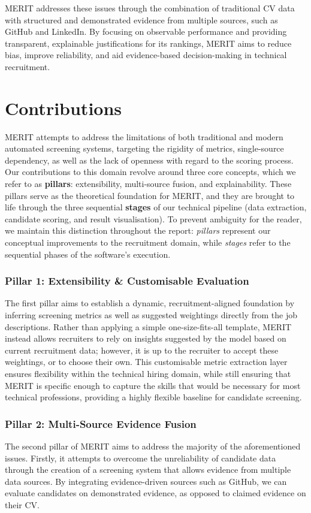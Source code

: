 MERIT addresses these issues through the combination of traditional CV data with structured and demonstrated
evidence from multiple sources, such as GitHub and LinkedIn. By focusing on observable performance and providing transparent,
explainable justifications for its rankings, MERIT aims to reduce bias, improve reliability, and aid evidence-based
decision-making in technical recruitment.


\section{Contributions}
MERIT attempts to address the limitations of both traditional and modern automated screening systems, targeting the
rigidity of metrics, single-source dependency, as well as the lack of openness with regard to the scoring process.
Our contributions to this domain revolve around three core concepts, which we refer to as \textbf{pillars}: 
extensibility, multi-source fusion, and explainability. These pillars serve as the theoretical foundation for 
MERIT, and they are brought to life through the three sequential \textbf{stages} of our technical pipeline (data 
extraction, candidate scoring, and result visualisation). To prevent ambiguity for the reader, we maintain this 
distinction throughout the report: \textit{pillars} represent our conceptual improvements to the recruitment domain, 
while \textit{stages} refer to the sequential phases of the software's execution.

\subsubsection{Pillar 1: Extensibility \& Customisable Evaluation}
The first pillar aims to establish a dynamic, recruitment-aligned foundation by inferring screening metrics as well as suggested weightings
directly from the job descriptions. Rather than applying a simple one-size-fits-all template, MERIT instead allows recruiters to 
rely on insights suggested by the model based on current recruitment data; however, it is up to the recruiter to accept these weightings,
or to choose their own. This customisable metric extraction layer ensures flexibility within the technical hiring domain, while still
ensuring that MERIT is specific enough to capture the skills that would be necessary for most technical professions, providing a 
highly flexible baseline for candidate screening.

\subsubsection{Pillar 2: Multi-Source Evidence Fusion}
The second pillar of MERIT aims to address the majority of the aforementioned issues. Firstly, it attempts to overcome the 
unreliability of candidate data through the creation of a screening system that allows evidence from multiple data sources.
By integrating evidence-driven sources such as GitHub, we can evaluate candidates on demonstrated evidence, as opposed to claimed
evidence on their CV.

